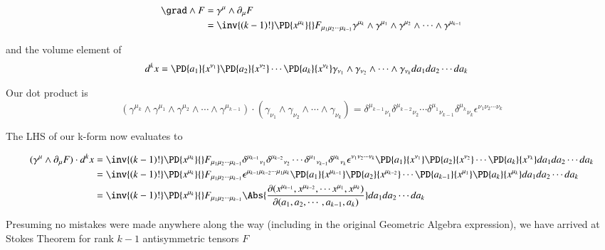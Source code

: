\begin{align*}
\grad \wedge F 
&=
\gamma^\mu \wedge \partial_\mu F \\
&=
\inv{(k-1)!}\PD{x^{\mu_k}}{} F_{\mu_1 \mu_2 \cdots \mu_{k-1}}
\gamma^{\mu_k} \wedge
\gamma^{\mu_1} \wedge \gamma^{ \mu_2 } \wedge \cdots \wedge \gamma^{\mu_{k-1}} 
\end{align*}

and the volume element of
\begin{align*}
d^k x 
&=
\PD{a_1}{x^{\nu_1}}
\PD{a_2}{x^{\nu_2}}
\cdots
\PD{a_k}{x^{\nu_{k}}}
\gamma_{\nu_1} \wedge \gamma_{ \nu_2 } \wedge \cdots \wedge \gamma_{\nu_k}
da_1 da_2 \cdots da_k
\end{align*}

Our dot product is
\begin{equation}\label{eqn:antisymmetricTensorTx:630}
\left(\gamma^{\mu_k} \wedge
\gamma^{\mu_1} \wedge \gamma^{ \mu_2 } \wedge \cdots \wedge \gamma^{\mu_{k-1}} \right) \cdot
\left( \gamma_{\nu_1} \wedge \gamma_{ \nu_2 } \wedge \cdots \wedge \gamma_{\nu_k} \right)
=
{\delta^{\mu_{k-1}}}_{\nu_1}  {\delta^{ \mu_{k-2} }}_{\nu_2}  \cdots  
{\delta^{\mu_{1}} }_{\nu_{k-1}}
{\delta^{\mu_{k}} }_{\nu_{k}}
\epsilon^{\nu_1 \nu_2 \cdots \nu_{k}}
\end{equation}

The LHS of our k-form now evaluates to

\begin{align*}
(\gamma^\mu \wedge \partial_\mu F) \cdot d^k x 
&=
\inv{(k-1)!}\PD{x^{\mu_k}}{} F_{\mu_1 \mu_2 \cdots \mu_{k-1}}
{\delta^{\mu_{k-1}}}_{\nu_1}  {\delta^{ \mu_{k-2} }}_{\nu_2}  \cdots  
{\delta^{\mu_{1}} }_{\nu_{k-1}}
{\delta^{\mu_{k}} }_{\nu_{k}}
\epsilon^{\nu_1 \nu_2 \cdots \nu_{k}}
\PD{a_1}{x^{\nu_1}}
\PD{a_2}{x^{\nu_2}}
\cdots
\PD{a_k}{x^{\nu_{k}}}
da_1 da_2 \cdots da_k \\
&=
\inv{(k-1)!}\PD{x^{\mu_k}}{} F_{\mu_1 \mu_2 \cdots \mu_{k-1}}
\epsilon^{\mu_{k-1} \mu_{k-2} \cdots \mu_1 \mu_{k}}
\PD{a_1}{x^{\mu_{k-1}}}
\PD{a_2}{x^{\mu_{k-2}}}
\cdots
\PD{a_{k-1}}{x^{\mu_{1}}}
\PD{a_k}{x^{\mu_{k}}}
da_1 da_2 \cdots da_k \\
&=
\inv{(k-1)!}\PD{x^{\mu_k}}{} F_{\mu_1 \mu_2 \cdots \mu_{k-1}}
\Abs{\frac{\partial(
x^{\mu_{k-1}},
x^{\mu_{k-2}},
\cdots
x^{\mu_{1}},
x^{\mu_{k}}
)}{\partial(a_1, a_2, \cdots, a_{k-1}, a_k)}
}
da_1 da_2 \cdots da_k \\
\end{align*}

Presuming no mistakes were made anywhere along the way (including in the original Geometric Algebra expression), we have arrived at Stokes Theorem for rank $k-1$ antisymmetric tensors $F$


